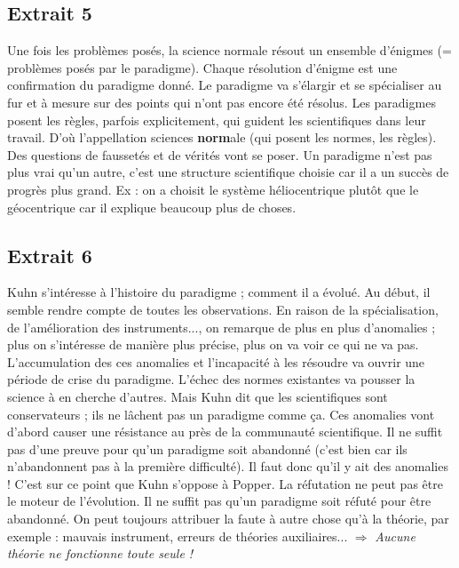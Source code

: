 \subsection{Extrait 5}
Une fois les problèmes posés, la science normale résout un ensemble d'énigmes (= problèmes posés par le paradigme).
Chaque résolution d'énigme est une confirmation du paradigme donné.
Le paradigme va s'élargir et se spécialiser au fur et à mesure sur des points qui n'ont pas encore été résolus.
Les paradigmes posent les règles, parfois explicitement, qui guident les scientifiques dans leur travail.
D'où l'appellation sciences \textbf{norm}ale (qui posent les normes, les règles).
Des questions de faussetés et de vérités vont se poser.
Un paradigme n'est pas plus vrai qu'un autre, c'est une structure scientifique choisie car il a un succès de progrès plus grand.
Ex : on a choisit le système héliocentrique plutôt que le géocentrique car il explique beaucoup plus de choses.
\subsection{Extrait 6}
Kuhn s'intéresse à l'histoire du paradigme ; comment il a évolué.
Au début, il semble  rendre compte de toutes les observations.
En raison de la spécialisation, de l'amélioration des instruments..., on remarque de plus en plus d'anomalies ; plus on s'intéresse de manière plus précise, plus on va voir ce qui ne va pas.
L'accumulation des ces anomalies et l'incapacité à les résoudre va ouvrir une période de crise du paradigme.
L'échec des normes existantes va pousser la science à en cherche d'autres.
Mais Kuhn dit que les scientifiques sont conservateurs ; ils ne lâchent pas un paradigme comme ça.
Ces anomalies vont d'abord causer une résistance au près de la communauté scientifique.
Il ne suffit pas d'une preuve pour qu'un paradigme soit abandonné (c'est bien car ils n'abandonnent pas à la première difficulté).
Il faut donc qu'il y ait des anomalies ! C'est sur ce point que Kuhn s'oppose à Popper.
La réfutation ne peut pas être le moteur de l'évolution.
Il ne suffit pas qu'un paradigme soit réfuté pour être abandonné.
On peut toujours attribuer la faute à autre chose qu'à la théorie, par exemple : mauvais instrument, erreurs de théories auxiliaires... $\Rightarrow$ \emph{Aucune théorie ne fonctionne toute seule !}
